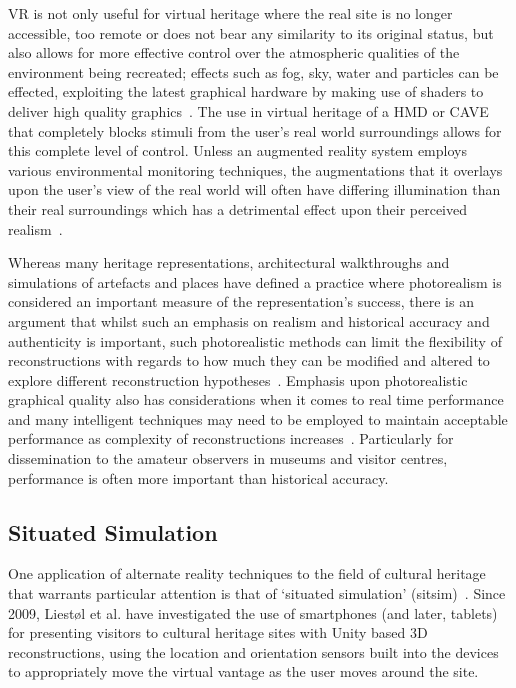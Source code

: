 VR is not only useful for virtual heritage where the real site is no longer accessible, too remote or does not bear any similarity to its original status, but also allows for more effective control over the atmospheric qualities of the environment being recreated; effects such as fog, sky, water and particles can be effected, exploiting the latest graphical hardware by making use of shaders to deliver high quality graphics~\cite{deamicis:gamebased}. The use in virtual heritage of a HMD or CAVE~\cite{cabral:x3dexperience,Christou2006} that completely blocks stimuli from the user's real world surroundings allows for this complete level of control. Unless an augmented reality system employs various environmental monitoring techniques, the augmentations that it overlays upon the user's view of the real world will often have differing illumination than their real surroundings which has a detrimental effect upon their perceived realism~\cite{mcnamara:lightness}.

Whereas many heritage representations, architectural walkthroughs and simulations of artefacts and places have defined a practice where photorealism is considered an important measure of the representation's success, there is an argument that whilst such an emphasis on realism and historical accuracy and authenticity is important, such photorealistic methods can limit the flexibility of reconstructions with regards to how much they can be modified and altered to explore different reconstruction hypotheses~\cite{roussou:photorealism}. Emphasis upon photorealistic graphical quality also has considerations when it comes to real time performance and many intelligent techniques may need to be employed to maintain acceptable performance as complexity of reconstructions increases~\cite{willmott:largecomplex}. Particularly for dissemination to the amateur observers in museums and visitor centres, performance is often more important than historical accuracy.


\subsection{Situated Simulation}
\label{situated-simulation}
One application of alternate reality techniques to the field of cultural heritage that warrants particular attention is that of `situated simulation' (sitsim)~\cite{Liestøl2009}. Since 2009, Liest\o l et al. have investigated the use of smartphones (and later, tablets) for presenting visitors to cultural heritage sites with Unity based 3D reconstructions, using the location and orientation sensors built into the devices to appropriately move the virtual vantage as the user moves around the site.

